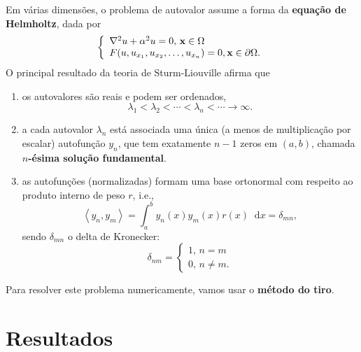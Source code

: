 \documentclass[twocolumn,showpacs,%
  nofootinbib,aps,superscriptaddress,%
  eqsecnum,prd,notitlepage,showkeys,10pt]{revtex4-1}
\newcommand*\diff{\mathop{}\!\mathrm{d}}
\begin{document}
Em várias dimensões, o problema de autovalor assume a forma da
\textbf{equação de Helmholtz}, dada por
%
\begin{equation}
\label{eq:helmholtz}
    \left\{
    \begin{array}{l}
        \laplacian u + \alpha^2u = 0, \, \mathbf{x}\in\Omega \\
        F(u, u_{x_1}, u_{x_2}, \dots, u_{x_n}) = 0, \mathbf{x}\in\partial\Omega.
    \end{array}
    \right.
\end{equation}
%
O principal resultado da teoria de Sturm-Liouville afirma que
%
\begin{enumerate}
    \item os autovalores são reais e podem ser ordenados,
    \[
        \lambda_1 < \lambda_2 < \cdots < \lambda_n < \cdots \to \infty.
    \]
    \item a cada autovalor $\lambda_n$ está associada uma única (a menos
    de multiplicação por escalar) autofunção $y_n$, que tem exatamente 
    $n-1$ zeros em $(a,b)$, chamada \textbf{$n$-ésima solução fundamental}.

    \item as autofunções (normalizadas) formam uma base ortonormal com
    respeito ao produto interno de peso $r$, i.e.,
    \[
        \left\langle y_n, y_m \right\rangle
        = \int_a^b y_n(x)y_m(x)r(x) \diff x
        = \delta_{mn},
    \]
    sendo $\delta_{mn}$ o delta de Kronecker:
    \[
        \delta_{nm} = \left\{
        \begin{array}{l}
            1, \, n = m \\
            0, \, n\neq m.
        \end{array}
        \right.
    \]
\end{enumerate}
%
Para resolver este problema numericamente, vamos usar o
\textbf{método do tiro}.
%
\section{Resultados}
\label{sec:resultados}
%
\end{document}
